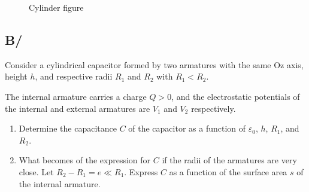 \documentclass[12pt]{article}
\begin{document}
\begin{figure}[H]
    \centering
\caption{Cylinder figure}
\end{figure}

\subsection*{B/} Consider a cylindrical capacitor formed by two armatures with the same Oz axis, height $h$, and respective radii $R_1$ and $R_2$ with $R_1 < R_2$.

The internal armature carries a charge $Q > 0$, and the electrostatic potentials of the internal and external armatures are $V_1$ and $V_2$ respectively.

\begin{enumerate}
    \item Determine the capacitance $C$ of the capacitor as a function of $\varepsilon_0$, $h$, $R_1$, and $R_2$.
    
    \item What becomes of the expression for $C$ if the radii of the armatures are very close.
    Let $R_2 - R_1 = e \ll R_1$. Express $C$ as a function of the surface area $s$ of the internal armature.
\end{enumerate}
\end{document}
